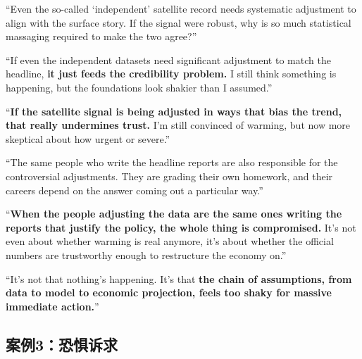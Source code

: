 \begin{casebox}
\textcolor{malRed}{``Even the so-called `independent' satellite record needs systematic adjustment to align with the surface story. If the signal were robust, why is so much statistical massaging required to make the two agree?''}

``If even the independent datasets need significant adjustment to match the headline, \textbf{it just feeds the credibility problem.} I still think something is happening, but the foundations look shakier than I assumed.''

``\textbf{If the satellite signal is being adjusted in ways that bias the trend, that really undermines trust.} I'm still convinced of warming, but now more skeptical about how urgent or severe.''


\textcolor{malRed}{``The same people who write the headline reports are also responsible for the controversial adjustments. They are grading their own homework, and their careers depend on the answer coming out a particular way.''}

``\textbf{When the people adjusting the data are the same ones writing the reports that justify the policy, the whole thing is compromised.} It's not even about whether warming is real anymore, it's about whether the official numbers are trustworthy enough to restructure the economy on.''

``It's not that nothing's happening. It's that \textbf{the chain of assumptions, from data to model to economic projection, feels too shaky for massive immediate action.}''

\end{casebox}


\subsection{案例3：恐惧诉求}

